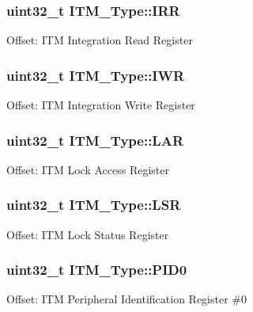 \subsubsection[{\texorpdfstring{I\+RR}{IRR}}]{ uint32\+\_\+t I\+T\+M\+\_\+\+Type\+::\+I\+RR}\hypertarget{structITM__Type_ae43a66174b8ab182ff595e5f5da9f235}{}\label{structITM__Type_ae43a66174b8ab182ff595e5f5da9f235}
Offset\+: I\+TM Integration Read Register 
\subsubsection[{\texorpdfstring{I\+WR}{IWR}}]{ uint32\+\_\+t I\+T\+M\+\_\+\+Type\+::\+I\+WR}\hypertarget{structITM__Type_af53499fc94cda629afb2fec858d2ad1c}{}\label{structITM__Type_af53499fc94cda629afb2fec858d2ad1c}
Offset\+: I\+TM Integration Write Register 
\subsubsection[{\texorpdfstring{L\+AR}{LAR}}]{ uint32\+\_\+t I\+T\+M\+\_\+\+Type\+::\+L\+AR}\hypertarget{structITM__Type_a33025af19748bd3ca5cf9d6b14150001}{}\label{structITM__Type_a33025af19748bd3ca5cf9d6b14150001}
Offset\+: I\+TM Lock Access Register 
\subsubsection[{\texorpdfstring{L\+SR}{LSR}}]{ uint32\+\_\+t I\+T\+M\+\_\+\+Type\+::\+L\+SR}\hypertarget{structITM__Type_a56f607260c4175c5f37a28e47ab3d1e5}{}\label{structITM__Type_a56f607260c4175c5f37a28e47ab3d1e5}
Offset\+: I\+TM Lock Status Register 
\subsubsection[{\texorpdfstring{P\+I\+D0}{PID0}}]{ uint32\+\_\+t I\+T\+M\+\_\+\+Type\+::\+P\+I\+D0}\hypertarget{structITM__Type_ab69ade751350a7758affdfe396517535}{}\label{structITM__Type_ab69ade751350a7758affdfe396517535}
Offset\+: I\+TM Peripheral Identification Register \#0 
